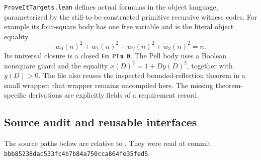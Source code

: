\texttt{ProveItTargets.lean} defines actual formulas in the object language, parameterized by the still-to-be-constructed primitive recursive witness codes. For example its four-square body has one free variable and is the literal object equality
\[
 w_0(n)^2+w_1(n)^2+w_2(n)^2+w_3(n)^2=n.
\]
Its universal closure is a closed \texttt{Fm PTm 0}. The Pell body uses a Boolean nonsquare guard and the equality $x(D)^2=1+Dy(D)^2$, together with $y(D)>0$. The file also reuses the inspected bounded-reflection theorem in a small wrapper; that wrapper remains uncompiled here. The missing theorem-specific derivations are explicitly fields of a requirement record.

\subsection{Source audit and reusable interfaces}
The source paths below are relative to
.
They were read at commit \texttt{bbb85238dac533fc4b7b84a750cca864fe35fed5}.
